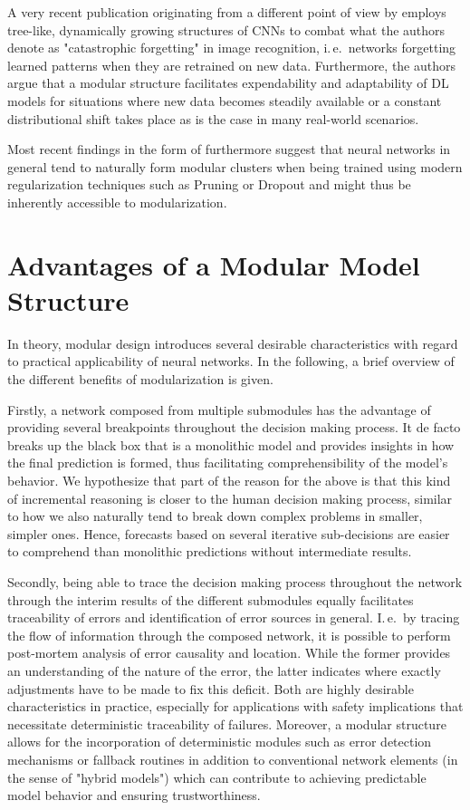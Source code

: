 \documentclass[conference]{IEEEtran}
\begin{document}
A very recent publication originating from a different point of view by \cite{Roy2020-rv} employs tree-like, dynamically growing structures of CNNs to combat what the authors denote as "catastrophic forgetting" in image recognition, i.\,e.\ networks forgetting learned patterns when they are retrained on new data. Furthermore, the authors argue that a modular structure facilitates expendability and adaptability of DL models for situations where new data becomes steadily available or a constant distributional shift takes place as is the case in many real-world scenarios.

Most recent findings in the form of \cite{Filan2020-nx} furthermore suggest that neural networks in general tend to naturally form modular clusters when being trained using modern regularization techniques such as Pruning or Dropout and might thus be inherently accessible to modularization.

\section{Advantages of a Modular Model Structure%
         \label{sec:advantages}}

In theory, modular design introduces several desirable characteristics with regard to practical applicability of neural networks. In the following, a brief overview of the different benefits of modularization is given.

Firstly, a network composed from multiple submodules has the advantage of providing several breakpoints throughout the decision making process. It de facto breaks up the black box that is a monolithic model and provides insights in how the final prediction is formed, thus facilitating comprehensibility of the model's behavior. We hypothesize that part of the reason for the above is that this kind of incremental reasoning is closer to the human decision making process, similar to how we also naturally tend to break down complex problems in smaller, simpler ones. Hence, forecasts based on several iterative sub-decisions are easier to comprehend than monolithic predictions without intermediate results.

Secondly, being able to trace the decision making process throughout the network through the interim results of the different submodules equally facilitates traceability of errors and identification of error sources in general. I.\,e.\ by tracing the flow of information through the composed network, it is possible to perform post-mortem analysis of error causality and location. While the former provides an understanding of the nature of the error, the latter indicates where exactly adjustments have to be made to fix this deficit. Both are highly desirable characteristics in practice, especially for applications with safety implications that necessitate deterministic traceability of failures. Moreover, a modular structure allows for the incorporation of deterministic modules such as error detection mechanisms or fallback routines in addition to conventional network elements (in the sense of "hybrid models") which can contribute to achieving predictable model behavior and ensuring trustworthiness.
\end{document}
